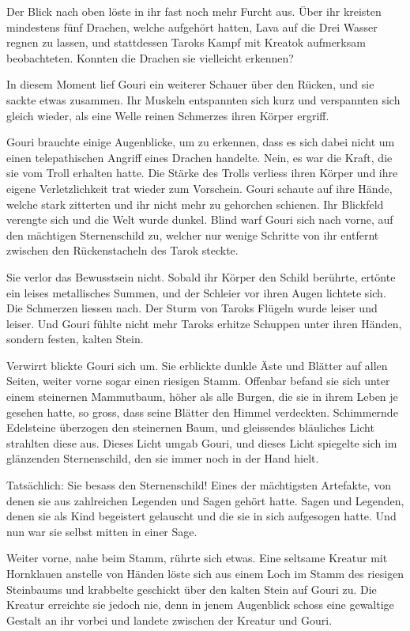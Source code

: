Der Blick nach oben löste in ihr fast noch mehr Furcht aus. Über ihr kreisten mindestens fünf Drachen, welche aufgehört hatten, Lava auf die Drei Wasser regnen zu lassen, und stattdessen Taroks Kampf mit Kreatok aufmerksam beobachteten. Konnten die Drachen sie vielleicht erkennen?

In diesem Moment lief Gouri ein weiterer Schauer über den Rücken, und sie sackte etwas zusammen. Ihr Muskeln entspannten sich kurz und verspannten sich gleich wieder, als eine Welle reinen Schmerzes ihren Körper ergriff.

Gouri brauchte einige Augenblicke, um zu erkennen, dass es sich dabei nicht um einen telepathischen Angriff eines Drachen handelte. Nein, es war die Kraft, die sie vom Troll erhalten hatte. Die Stärke des Trolls verliess ihren Körper und ihre eigene Verletzlichkeit trat wieder zum Vorschein. Gouri schaute auf ihre Hände, welche stark zitterten und ihr nicht mehr zu gehorchen schienen. Ihr Blickfeld verengte sich und die Welt wurde dunkel. Blind warf Gouri sich nach vorne, auf den mächtigen Sternenschild zu, welcher nur wenige Schritte von ihr entfernt zwischen den Rückenstacheln des Tarok steckte.

Sie verlor das Bewusstsein nicht. Sobald ihr Körper den Schild berührte, ertönte ein leises metallisches Summen, und der Schleier vor ihren Augen lichtete sich. Die Schmerzen liessen nach. Der Sturm von Taroks Flügeln wurde leiser und leiser. Und Gouri fühlte nicht mehr Taroks erhitze Schuppen unter ihren Händen, sondern festen, kalten Stein.

Verwirrt blickte Gouri sich um. Sie erblickte dunkle Äste und Blätter auf allen Seiten, weiter vorne sogar einen riesigen Stamm. Offenbar befand sie sich unter einem steinernen Mammutbaum, höher als alle Burgen, die sie in ihrem Leben je gesehen hatte, so gross, dass seine Blätter den Himmel verdeckten. Schimmernde Edelsteine überzogen den steinernen Baum, und gleissendes bläuliches Licht strahlten diese aus. Dieses Licht umgab Gouri, und dieses Licht spiegelte sich im glänzenden Sternenschild, den sie immer noch in der Hand hielt.

Tatsächlich: Sie besass den Sternenschild! Eines der mächtigsten Artefakte, von denen sie aus zahlreichen Legenden und Sagen gehört hatte. Sagen und Legenden, denen sie als Kind begeistert gelauscht und die sie in sich aufgesogen hatte. Und nun war sie selbst mitten in einer Sage.

Weiter vorne, nahe beim Stamm, rührte sich etwas. Eine seltsame Kreatur mit Hornklauen anstelle von Händen löste sich aus einem Loch im Stamm des riesigen Steinbaums und krabbelte geschickt über den kalten Stein auf Gouri zu. Die Kreatur erreichte sie jedoch nie, denn in jenem Augenblick schoss eine gewaltige Gestalt an ihr vorbei und landete zwischen der Kreatur und Gouri.

